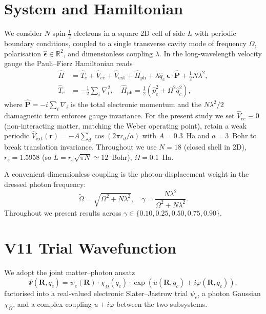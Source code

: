 \documentclass[reprint,amsmath,amssymb,aps,prb,floatfix,nofootinbib]{revtex4-2}
\newcommand{\Oeff}{\widetilde{\Omega}}
\begin{document}
\section{System and Hamiltonian}\label{sec:hamiltonian}
We consider $N$ spin-$\tfrac12$ electrons in a square 2D cell of side
$L$ with periodic boundary conditions, coupled to a single transverse
cavity mode of frequency $\Omega$, polarisation
$\hat{\bm\epsilon} \in \mathbb{R}^2$, and dimensionless coupling
$\lambda$.  In the long-wavelength velocity gauge the Pauli--Fierz
Hamiltonian reads
\begin{align}
\hat H &= \hat T_e + \hat V_{ee} + \hat V_{\mathrm{ext}}
       + \hat H_{\mathrm{ph}}
       + \lambda \hat{q}_c \, \hat{\bm\epsilon} \cdot \hat{\mathbf{P}}
       + \tfrac12 N \lambda^2,\\
\hat T_e &= -\tfrac12 \sum_i \nabla_i^2,\quad
\hat H_{\mathrm{ph}} = \tfrac12 (\hat p_c^2 + \Omega^2 \hat q_c^2),
\end{align}
where $\hat{\mathbf P} = -i\sum_i \nabla_i$ is the total electronic
momentum and the $N\lambda^2/2$ diamagnetic term enforces gauge
invariance.  For the present study we set
$\hat V_{ee} \equiv 0$ (non-interacting matter, matching the Weber
operating point), retain a weak periodic
$\hat V_{\mathrm{ext}}(\mathbf{r}) = -A \sum_{d} \cos(2\pi r_d / a)$
with $A = 0.3$~Ha and $a = 3$~Bohr to break translation
invariance.  Throughout we use $N=18$ (closed shell in 2D),
$r_s = 1.5958$ (so $L = r_s\sqrt{\pi N} \simeq 12$~Bohr), $\Omega
= 0.1$~Ha.

A convenient dimensionless coupling is the photon-displacement
weight in the dressed photon frequency:
\begin{equation}
\Oeff = \sqrt{\Omega^2 + N \lambda^2},\quad
\gamma = \frac{N \lambda^2}{\Omega^2 + N \lambda^2}.
\end{equation}
Throughout we present results across
$\gamma \in \{0.10, 0.25, 0.50, 0.75, 0.90\}$.

\section{V11 Trial Wavefunction}\label{sec:ansatz}
We adopt the joint matter--photon ansatz
\begin{equation}
\Psi(\mathbf{R}, q_c) = \psi_e(\mathbf{R}) \cdot \chi_{\Oeff}(q_c)
                       \cdot \exp(u(\mathbf{R}, q_c)
                       + i \varphi(\mathbf{R}, q_c)),
\label{eq:ansatz}
\end{equation}
factorised into a real-valued electronic Slater--Jastrow trial
$\psi_e$, a photon Gaussian $\chi_{\Oeff}$, and a complex coupling
$u + i\varphi$ between the two subsystems.
\end{document}
